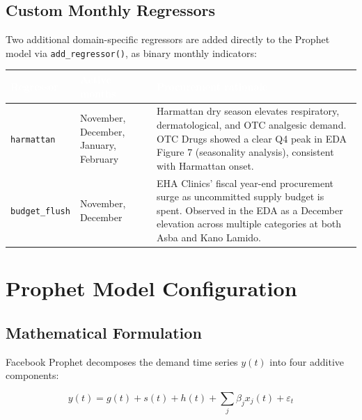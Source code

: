 \documentclass[12pt, a4paper]{article}
\begin{document}
\subsection{Custom Monthly Regressors}

Two additional domain-specific regressors are added directly to the
Prophet model via \texttt{add\_regressor()}, as binary monthly indicators:

\vspace{0.5em}
\noindent
\begin{tabularx}{\textwidth}{@{} L{3.2cm} L{3.0cm} X @{}}
  \toprule
  \textcolor{white}{\textbf{Regressor}} &
  \textcolor{white}{\textbf{Active months}} &
  \textcolor{white}{\textbf{Procurement rationale}} \\
  \midrule
  \texttt{harmattan} &
    November, December, January, February &
    Harmattan dry season elevates respiratory, dermatological, and OTC
    analgesic demand. OTC Drugs showed a clear Q4 peak in EDA Figure 7
    (seasonality analysis), consistent with Harmattan onset. \\
  \texttt{budget\_flush} &
    November, December &
    EHA Clinics' fiscal year-end procurement surge as uncommitted supply
    budget is spent. Observed in the EDA as a December elevation across
    multiple categories at both Asba and Kano Lamido. \\
  \bottomrule
\end{tabularx}
\vspace{0.3em}
\label{tab:regressors}

\section{Prophet Model Configuration}

\subsection{Mathematical Formulation}

Facebook Prophet decomposes the demand time series $y(t)$ into four
additive components:

\[
  y(t) = g(t) + s(t) + h(t) + \sum_{j} \beta_j x_j(t) + \varepsilon_t
\]
\end{document}
